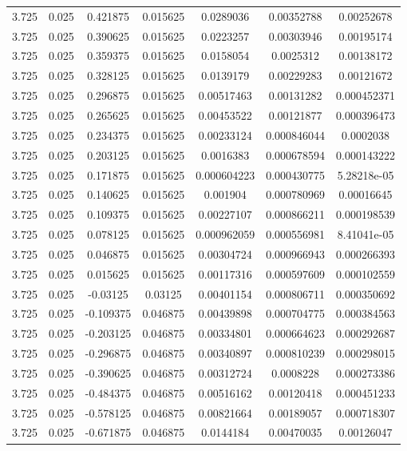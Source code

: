 \begin{flushleft}
\begin{longtable}{ccccccc}
3.725 & 0.025 & 0.421875 & 0.015625 & 0.0289036 & 0.00352788 & 0.00252678  \\ 
3.725 & 0.025 & 0.390625 & 0.015625 & 0.0223257 & 0.00303946 & 0.00195174  \\ 
3.725 & 0.025 & 0.359375 & 0.015625 & 0.0158054 & 0.0025312 & 0.00138172  \\ 
3.725 & 0.025 & 0.328125 & 0.015625 & 0.0139179 & 0.00229283 & 0.00121672  \\ 
3.725 & 0.025 & 0.296875 & 0.015625 & 0.00517463 & 0.00131282 & 0.000452371  \\ 
3.725 & 0.025 & 0.265625 & 0.015625 & 0.00453522 & 0.00121877 & 0.000396473  \\ 
3.725 & 0.025 & 0.234375 & 0.015625 & 0.00233124 & 0.000846044 & 0.0002038  \\ 
3.725 & 0.025 & 0.203125 & 0.015625 & 0.0016383 & 0.000678594 & 0.000143222  \\ 
3.725 & 0.025 & 0.171875 & 0.015625 & 0.000604223 & 0.000430775 & 5.28218e-05  \\ 
3.725 & 0.025 & 0.140625 & 0.015625 & 0.001904 & 0.000780969 & 0.00016645  \\ 
3.725 & 0.025 & 0.109375 & 0.015625 & 0.00227107 & 0.000866211 & 0.000198539  \\ 
3.725 & 0.025 & 0.078125 & 0.015625 & 0.000962059 & 0.000556981 & 8.41041e-05  \\ 
3.725 & 0.025 & 0.046875 & 0.015625 & 0.00304724 & 0.000966943 & 0.000266393  \\ 
3.725 & 0.025 & 0.015625 & 0.015625 & 0.00117316 & 0.000597609 & 0.000102559  \\ 
3.725 & 0.025 & -0.03125 & 0.03125 & 0.00401154 & 0.000806711 & 0.000350692  \\ 
3.725 & 0.025 & -0.109375 & 0.046875 & 0.00439898 & 0.000704775 & 0.000384563  \\ 
3.725 & 0.025 & -0.203125 & 0.046875 & 0.00334801 & 0.000664623 & 0.000292687  \\ 
3.725 & 0.025 & -0.296875 & 0.046875 & 0.00340897 & 0.000810239 & 0.000298015  \\ 
3.725 & 0.025 & -0.390625 & 0.046875 & 0.00312724 & 0.0008228 & 0.000273386  \\ 
3.725 & 0.025 & -0.484375 & 0.046875 & 0.00516162 & 0.00120418 & 0.000451233  \\ 
3.725 & 0.025 & -0.578125 & 0.046875 & 0.00821664 & 0.00189057 & 0.000718307  \\ 
3.725 & 0.025 & -0.671875 & 0.046875 & 0.0144184 & 0.00470035 & 0.00126047  \\ 

\end{longtable}
\end{flushleft}
